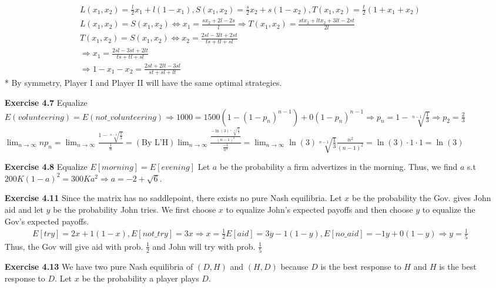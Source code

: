\documentclass[10pt]{article}[H]
\begin{document}
\begin{itemize}
        \begin{align*}
        L(x_1,x_2)=\frac{l}{2}x_1+l(1-x_1), S(x_1,x_2)=\frac{s}{2}x_2+s(1-x_2), T(x_1,x_2)=\frac{t}{2}(1+x_1+x_2)\\
        L(x_1,x_2)=S(x_1,x_2)\Leftrightarrow x_1=\frac{sx_2+2l-2s}{l}\Rightarrow T(x_1,x_2)=\frac{stx_2+ltx_2+3lt-2st}{2l}\\
        T(x_1,x_2)=S(x_1,x_2)\Leftrightarrow x_2=\frac{2sl-3lt+2st}{ts+tl+sl}\\
        \Rightarrow x_1=\frac{2sl-3st+2lt}{ts+tl+sl}\\
        \Rightarrow 1-x_1-x_2=\frac{2st+2lt-3sl}{st+sl+lt}
        \end{align*}
       * By symmetry, Player I and Player II will have the same optimal strategies.
    \item [\textbf{Exercise 4.7}] Equalize $E(volunteering)=E(not\_volunteering)\Rightarrow 1000=1500(1-{(1-p_n)}^{n-1})+0{(1-p_n)}^{n-1}\Rightarrow p_n=1-\sqrt[n-1]{\frac{1}{3}}\Rightarrow p_2=\frac{2}{3}$\\
    $\displaystyle \lim_{n\rightarrow\infty}np_n=\lim_{n\rightarrow\infty}\frac{1-\sqrt[n-1]{\frac{1}{3}}}{\frac{1}{n}}=(\text{By L'H})\lim_{n\rightarrow\infty}\frac{\frac{-\ln(3)\sqrt[n-1]{\frac{1}{3}}}{{(n-1)}^2}}{\frac{-1}{n^2}}=\lim_{n\rightarrow\infty}\ln(3)\sqrt[n-1]{\frac{1}{3}}\frac{n^2}{{(n-1)}^2}=\ln(3)\cdot1\cdot1=\ln(3)$
    \item [\textbf{Exercise 4.8}] Equalize $E[morning]=E[evening]$ Let $a$ be the probability a firm advertizes in the morning. Thus, we find $a$ s.t $200K{(1-a)}^2=300K a^2\Rightarrow a=-2+\sqrt{6}$.
    \item [\textbf{Exercise 4.11}] Since the matrix has no saddlepoint, there exists no pure Nash equilibria. Let $x$ be the probability the Gov. gives John aid and let $y$ be the probability John tries. We first choose $x$ to equalize John's expected payoffs and then choose $y$ to equalize the Gov's expected payoffs.
    \begin{align*}
        E[try]=2x+1(1-x),E[not\_try]=3x\Rightarrow x=\frac{1}{2}
        E[aid]=3y-1(1-y),E[no\_aid]=-1y+0(1-y)\Rightarrow y=\frac{1}{5}
    \end{align*}
    Thus, the Gov will give aid with prob. $\frac{1}{2}$ and John will try with prob. $\frac{1}{5}$
    \item [\textbf{Exercise 4.13}] We have two pure Nash equilibria of $(D,H)$ and $(H,D)$ because $D$ is the best response to $H$ and $H$ is the best response to $D$. Let $x$ be the probability a player plays $D$.

\end{itemize}
\end{document}
